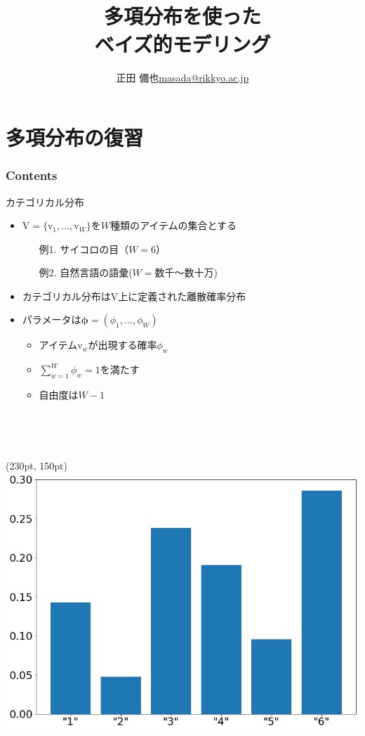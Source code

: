 \documentclass[aspectratio=169,unicode,dvipdfmx,14pt]{beamer}
\title{ \\多項分布を使った\\ベイズ的モデリング}
\author{\texorpdfstring{正田 備也\newline\href{mailto:masada@rikkyo.ac.jp}{masada@rikkyo.ac.jp}}{正田 備也}}
\date{}
\begin{document}
\begin{frame}
\titlepage
\end{frame}

\section{多項分布の復習}

\begin{frame}\frametitle{Contents}
\Large \tableofcontents[currentsection]
\end{frame}

\begin{frame}{カテゴリカル分布}
\begin{itemize}
\item $\mbox{V}=\{\mbox{v}_1,\ldots,\mbox{v}_W\}$を$W$種類のアイテムの集合とする
\begin{itemize}
\item[例1.] サイコロの目（$W=6$）
\item[例2.] 自然言語の語彙($W=\mbox{数千〜数十万}$)
\end{itemize}
\item カテゴリカル分布は$\mbox{V}$上に定義された離散確率分布
\item パラメータは$\bm{\phi}=(\phi_1,\ldots,\phi_W)$
\begin{itemize}
\item アイテム$\mbox{v}_w$が出現する確率$\phi_w$
\item $\sum_{w=1}^W \phi_w = 1$を満たす
\item 自由度は$W-1$
\item[] \ 
\item[] \ 
\end{itemize}
\end{itemize}
\begin{textblock*}{0.5\linewidth}(230pt, 150pt)
    \centering
    \includegraphics[width=0.7\linewidth]{dice_bar_chart.png}
\end{textblock*}
\end{frame}
\end{document}
